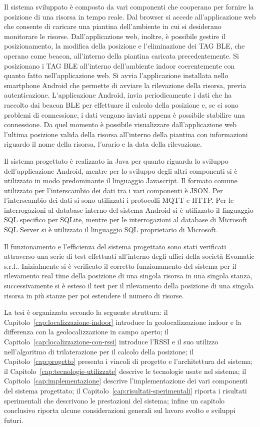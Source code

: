 Il sistema sviluppato è composto da vari componenti che cooperano per fornire la posizione di una risorsa in tempo reale. Dal browser si accede all'applicazione web che consente di caricare una piantina dell'ambiente in cui si desiderano monitorare le risorse. Dall'applicazione web, inoltre, è possibile gestire il posizionamento, la modifica della posizione e l'eliminazione dei TAG BLE, che operano come beacon, all'interno della piantina caricata precedentemente. Si posizionano i TAG BLE all'interno dell'ambiente indoor coerentemente con quanto fatto nell'applicazione web. Si avvia l'applicazione installata nello smartphone Android che permette di avviare la rilevazione della risorsa, previa autenticazione. L'applicazione Android, invia periodicamente i dati che ha raccolto dai beacon BLE per effettuare il calcolo della posizione e, se ci sono problemi di connessione, i dati vengono inviati appena è possibile stabilire una connessione. Da quel momento è possibile visualizzare dall'applicazione web l'ultima posizione valida della risorsa all'interno della piantina con informazioni riguardo il nome della risorsa, l'orario e la data della rilevazione.

Il sistema progettato è realizzato in Java per quanto riguarda lo sviluppo dell'applicazione Android, mentre per lo sviluppo degli altri componenti si è utilizzato in modo predominante il linguaggio Javascript. Il formato comune utilizzato per l'interscambio dei dati tra i vari componenti è JSON. Per l'interscambio dei dati si sono utilizzati i protocolli MQTT e HTTP. Per le interrogazioni al database interno del sistema Android si è utilizzato il linguaggio SQL specifico per SQLite, mentre per le interrogazioni al database di Microsoft SQL Server si è utilizzato il linguaggio SQL proprietario di Microsoft.

Il funzionamento e l'efficienza del sistema progettato sono stati verificati attraverso una serie di test effettuati all'interno degli uffici della società Evomatic s.r.l.. Inizialmente si è verificato il corretto funzionamento del sistema per il rilevamento real time della posizione di una singola risorsa in una singola stanza, successivamente si è esteso il test per il rilevamento della posizione di una singola risorsa in più stanze per poi estendere il numero di risorse.

La tesi è organizzata secondo la seguente struttura: il Capitolo~\ref{cap:localizzazione-indoor} introduce la geolocalizzazione indoor e la differenza con la geolocalizzazione in campo aperto; il Capitolo~\ref{cap:localizzazione-con-rssi} introduce l'RSSI e il suo utilizzo nell'algoritmo di trilaterazione per il calcolo della posizione; il Capitolo~\ref{cap:progetto} presenta i vincoli di progetto e l'architettura del sistema; il Capitolo~\ref{cap:tecnologie-utilizzate} descrive le tecnologie usate nel sistema; il Capitolo~\ref{cap:implementazione} descrive l'implementazione dei vari componenti del sistema progettato; il Capitolo~\ref{cap:risultati-sperimentali} riporta i risultati sperimentali che descrivono le prestazioni del sistema; infine un capitolo conclusivo riporta alcune considerazioni generali sul lavoro svolto e sviluppi futuri.

